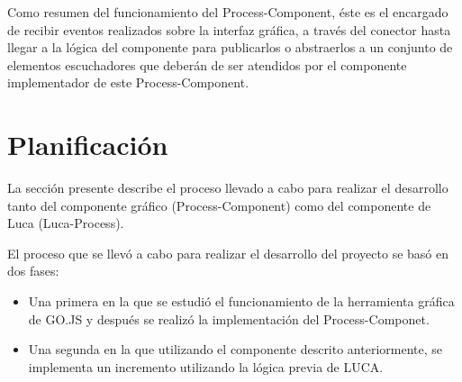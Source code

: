 Como resumen del funcionamiento del Process-Component, éste es el encargado de recibir eventos realizados sobre la interfaz gráfica, a través del conector hasta llegar a la lógica del componente para publicarlos o abstraerlos a un conjunto de elementos escuchadores que deberán de ser atendidos por el componente implementador de este Process-Component.


\section{Planificación}

La sección presente describe el proceso llevado a cabo para realizar el desarrollo tanto del componente gráfico (Process-Component) como del componente de Luca (Luca-Process).

El proceso que se llevó a cabo para realizar el desarrollo del proyecto se basó en dos fases:
	
\begin{itemize}
		\item  Una primera en la que se estudió el funcionamiento de la herramienta gráfica de GO.JS y después se realizó la implementación del Process-Componet.
		\item  Una segunda en la que utilizando el componente descrito anteriormente, se implementa un incremento utilizando la lógica previa de LUCA.
	\end{itemize}


